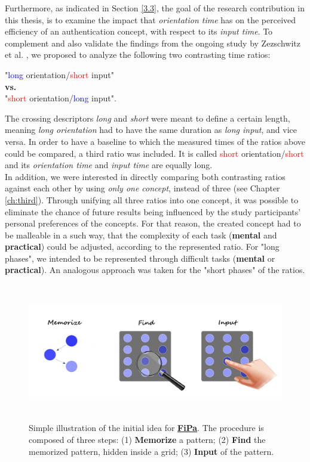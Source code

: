 Furthermore, as indicated in Section \ref{3.3}, the goal of the research contribution in this thesis, is to examine the impact that \textit{orientation time} has on the perceived efficiency of an authentication concept, with respect to its \textit{input time}. To complement and also validate the findings from the ongoing study by Zezschwitz et al. \cite{Zezschwitz}, we proposed to analyze the following two contrasting time ratios:  
\begin{center}
    "\textcolor{blue}{long} orientation/\textcolor{red}{short} input" \\
    \textbf{vs.} \\
    "\textcolor{red}{short} orientation/\textcolor{blue}{long} input".
\end{center} 

The crossing descriptors \textit{long} and \textit{short} were meant to define a certain length, meaning \textit{long orientation} had to have the same duration as \textit{long input}, and vice versa. In order to have a baseline to which the measured times of the ratios above could be compared, a third ratio was included. It is called \textcolor{red}{short} orientation/\textcolor{red}{short} and its \textit{orientation time} and \textit{input time} are equally long. \\
 

In addition, we were interested in directly comparing both contrasting ratios against each other by using \textit{only one concept}, instead of three (see Chapter \ref{ch:third}). Through unifying all three ratios into one concept, it was possible to eliminate the chance of future results being influenced by the study participants' personal preferences of the concepts.
For that reason, the created concept had to be malleable in a such way, that the complexity of each task (\textbf{mental} and \textbf{practical}) could be adjusted, according to the represented ratio. For "long phases", we intended to be represented through difficult tasks (\textbf{mental} or \textbf{practical}). An analogous approach was taken for the "short phases" of the ratios.

\begin{figure}[t!]
\centering
\includegraphics[width=15cm, height=6cm]{Chapters/graphics/ConceptIdea.jpeg}
\caption{Simple illustration of the initial idea for \underline{\textbf{FiPa}}. The procedure is composed of three steps: (1) \textbf{Memorize} a pattern; (2) \textbf{Find} the memorized pattern, hidden inside a grid; (3) \textbf{Input} of the pattern.}
\label{fig:concept}
\end{figure}

